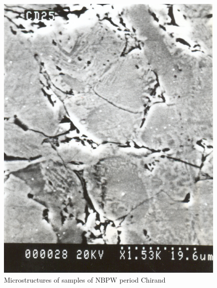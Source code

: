 \begin{figure}[H]
\renewcommand{\thefigure}{25D}
\includegraphics[scale=0.65]{images/chapter-4/fig025D.jpg}
\caption{Microstructures of samples of NBPW period Chirand}\label{chapter-4-fig25D}
\end{figure}

\newpage

